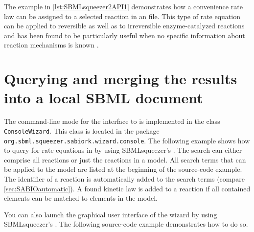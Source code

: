 The example in \vref{lst:SBMLsqueezer2API1} demonstrates how a convenience rate law \citep{Liebermeister2006} can be assigned to a selected reaction in an \SBML file.
This type of rate equation can be applied to reversible as well as to irreversible enzyme-catalyzed reactions and has been found to be particularly useful when no specific information about reaction mechanisms is known \citep{Draeger2007b, Draeger2009a, Draeger2011a}.


\section{Querying \SABIO and merging the results into a local \acs{SBML} document}

The command-line mode for the interface to \SABIO is implemented in the class \texttt{ConsoleWizard}.
This class is located in the package \texttt{org.sbml.squeezer.sabiork.wizard.console}.
The following example shows how to query for rate equations in \SABIO by using SBMLsqueezer's \API.
The search can either comprise all reactions or just the reactions in a model.
All search terms that can be applied to the model are listed at the beginning of the source-code example.
The \KEGG identifier of a reaction is automatically added to the search terms (compare \vref{sec:SABIOautomatic}).
A found kinetic law is added to a reaction if all contained elements can be matched to \SBML elements in the model.


You can also launch the graphical user interface of the \SABIO wizard by using SBMLsqueezer's \API.
The following source-code example demonstrates how to do so.



